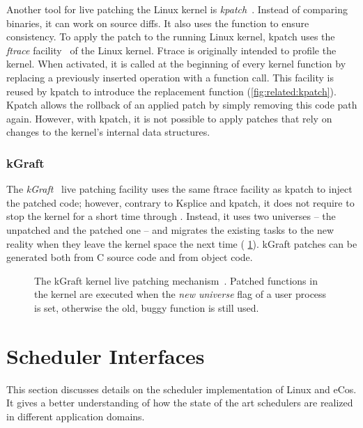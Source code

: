 Another tool for live patching the Linux kernel is \emph{kpatch}~\cite{kpatch}. Instead of comparing binaries, it can work on source diffs. It also uses the  function to ensure consistency. To apply the patch to the running Linux kernel, kpatch uses the \emph{ftrace} facility~\cite{ftrace} of the Linux kernel. Ftrace is originally intended to profile the kernel. When activated, it is called at the beginning of every kernel function by replacing a previously inserted  operation with a function call. This facility is reused by kpatch to introduce the replacement function (\cf \cref{fig:related:kpatch}). Kpatch allows the rollback of an applied patch by simply removing this code path again. However, with kpatch, it is not possible to apply patches that rely on changes to the kernel's internal data structures.

\subsubsection{kGraft}

The \emph{kGraft}~\cite{SUSE-2014-kGraft} live patching facility uses the same ftrace facility as kpatch to inject the patched code; however, contrary to Ksplice and kpatch, it does not require to stop the kernel for a short time through . Instead, it uses two universes -- the unpatched and the patched one -- and migrates the existing tasks to the new reality when they leave the kernel space the next time (\cf{} \cref{fig:related:kgraft}). kGraft patches can be generated both from C source code and from object code.

\begin{figure}[t!]\centering
	\caption[The kGraft kernel live patching mechanism]{The kGraft kernel live patching mechanism~\cite{Pavlik-2014-kGraft}. Patched functions in the kernel are executed when the \emph{new universe} flag of a user process is set, otherwise the old, buggy function is still used.}%
	\label{fig:related:kgraft}
\end{figure}

\section{Scheduler Interfaces}

This section discusses details on the scheduler implementation of Linux and eCos. It gives a better understanding of how the state of the art schedulers are realized in different application domains.%
\label{sec:related:patching!end}


